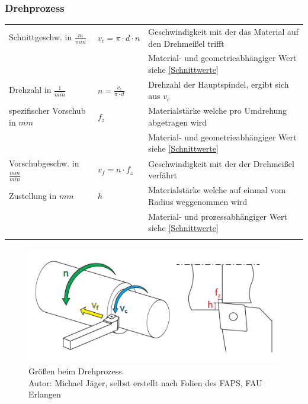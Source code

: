 \documentclass{\basedir/fablab-document}
\begin{document}
\subsubsection{Drehprozess}
\begin{tabular}{lll}
    Schnittgeschw. in $\frac{m}{min}$ 					& $v_c = \pi \cdot d \cdot n $ 			& Geschwindigkeit mit der das Material auf den Drehmeißel trifft 	\\ 
																								&																		& Material- und geometrieabhängiger Wert siehe \ref{Schnittwerte} \\ \addlinespace
		Drehzahl in $\frac{1}{min}$ 								& $ n = \frac{v_c}{\pi \cdot d} $		& Drehzahl der Hauptspindel, ergibt sich aus $v_c$								\\ \addlinespace
		spezifischer Vorschub in $mm$ 														& $ f_z $  													& Materialstärke welche pro Umdrehung abgetragen wird 						\\
																								&																		& Material- und geometrieabhängiger Wert siehe \ref{Schnittwerte} \\ \addlinespace
		Vorschubgeschw. in $\frac{mm}{min}$ 				& $ v_f = n \cdot f_z $ 						& Geschwindigkeit mit der der Drehmeißel verfährt			 						\\ \addlinespace
		Zustellung in $mm$ 													& $ h  $  													& Materialstärke welche auf einmal vom Radius weggenommen wird		\\
																								&																		& Material- und prozessabhängiger Wert siehe \ref{Schnittwerte} 	\\ \addlinespace
\end{tabular}

\begin{figure}[ht]
\centering
\includegraphics[width = 0.9\linewidth]{img/drehprozess}
\caption{Größen beim Drehprozess.\\Autor: Michael Jäger, selbst erstellt nach Folien des FAPS, FAU Erlangen}
\end{figure}
\end{document}
